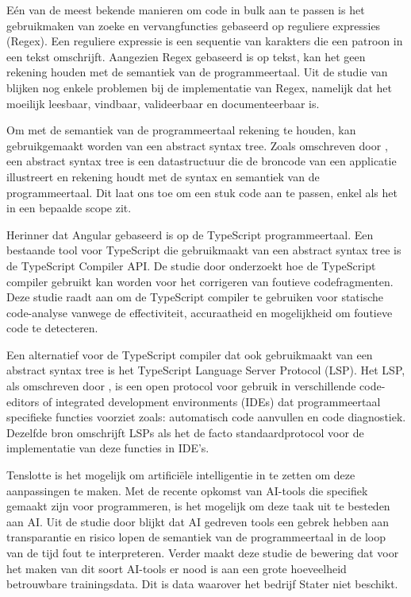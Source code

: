 Eén van de meest bekende manieren om code in bulk aan te passen is het gebruikmaken van zoeke en vervangfuncties gebaseerd op reguliere expressies (Regex).
Een reguliere expressie is een sequentie van karakters die een patroon in een tekst omschrijft.
Aangezien Regex gebaseerd is op tekst, kan het geen rekening houden met de semantiek van de programmeertaal.
Uit de studie van \textcite{Michael2019} blijken nog enkele problemen bij de implementatie van Regex, namelijk dat het moeilijk leesbaar, vindbaar, valideerbaar en documenteerbaar is.

Om met de semantiek van de programmeertaal rekening te houden, kan gebruikgemaakt worden van een abstract syntax tree.
Zoals omschreven door \textcite{Sun2023}, een abstract syntax tree is een datastructuur die de broncode van een applicatie illustreert en rekening houdt met de syntax en semantiek van de programmeertaal.
Dit laat ons toe om een stuk code aan te passen, enkel als het in een bepaalde scope zit.

Herinner dat Angular gebaseerd is op de TypeScript programmeertaal.
Een bestaande tool voor TypeScript die gebruikmaakt van een abstract syntax tree is de TypeScript Compiler API.
De studie door \textcite{Reid2023} onderzoekt hoe de TypeScript compiler gebruikt kan worden voor het corrigeren van foutieve codefragmenten. 
Deze studie raadt aan om de TypeScript compiler te gebruiken voor statische code-analyse vanwege de effectiviteit, accuraatheid en mogelijkheid om foutieve code te detecteren.

Een alternatief voor de TypeScript compiler dat ook gebruikmaakt van een abstract syntax tree is het TypeScript Language Server Protocol (LSP).
Het LSP, als omschreven door \textcite{Bork2023}, is een open protocol voor gebruik in verschillende code-editors of integrated development environments (IDEs) dat programmeertaal specifieke functies voorziet zoals: automatisch code aanvullen en code diagnostiek. 
Dezelfde bron omschrijft LSPs als het de facto standaardprotocol voor de implementatie van deze functies in IDE's.

Tenslotte is het mogelijk om artificiële intelligentie in te zetten om deze aanpassingen te maken.
Met de recente opkomst van AI-tools die specifiek gemaakt zijn voor programmeren, is het mogelijk om deze taak uit te besteden aan AI.
Uit de studie door \textcite{Hodovychenko2025} blijkt dat AI gedreven tools een gebrek hebben aan transparantie en risico lopen de semantiek van de programmeertaal in de loop van de tijd fout te interpreteren.
Verder maakt deze studie de bewering dat voor het maken van dit soort AI-tools er nood is aan een grote hoeveelheid betrouwbare trainingsdata.
Dit is data waarover het bedrijf Stater niet beschikt.

